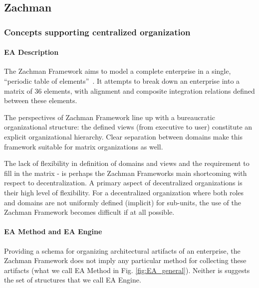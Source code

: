 \subsection{Zachman}
\subsubsection{Concepts supporting centralized organization}

\paragraph*{EA Description}
The Zachman Framework aims to model a complete enterprise in a single, ``periodic table of elements''~\cite{Bente2012}. It attempts to break down an enterprise into a matrix of 36 elements, with alignment and composite integration relations defined between these elements. 

The perspectives of Zachman Framework line up with a bureaucratic organizational structure: the defined views (from executive to user) constitute an explicit organizational hierarchy. Clear separation between domains make this framework suitable for matrix organizations as well. 

The lack of flexibility in definition of domains and views and the requirement to fill in the matrix - is perhaps the Zachman Frameworks main shortcoming with respect to decentralization. A primary aspect of decentralized organizations is their high level of flexibility. For a decentralized organization where both roles and domains are not uniformly defined (implicit) for sub-units, the use of the Zachman Framework becomes difficult if at all possible.


\paragraph*{EA Method and EA Engine}

Providing a schema for organizing architectural artifacts of an enterprise, the Zachman Framework does not imply any particular method for collecting these artifacts (what we call EA Method in Fig. \ref{fig:EA_general}).
Neither is suggests the set of structures that we call EA Engine. 


